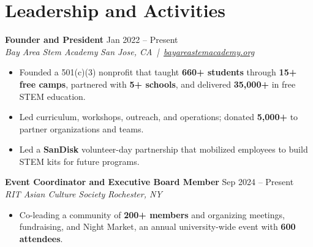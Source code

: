 \documentclass[10pt,letterpaper]{article}
\newif\ifresumeFirstRole
\newcommand{\resumeRole}[4]{%
  \ifresumeFirstRole
    \global\resumeFirstRolefalse
  \else
    \vspace{0pt plus 1fill}%
  \fi
  \textbf{#1} \hfill #2\\
  \textit{#3} \hfill \textit{#4}
}
\begin{document}
\section*{Leadership and Activities}
\resumeRole{Founder and President}{Jan 2022 -- Present}{Bay Area Stem Academy}{San Jose, CA \,|\, \href{https://bayareastemacademy.org}{bayareastemacademy.org}}
\begin{itemize}
  \item Founded a 501(c)(3) nonprofit that taught \textbf{660+ students} through \textbf{15+ free camps}, partnered with \textbf{5+ schools}, and delivered \textbf{\textdollar{}35,000+} in free STEM education.
  \item Led curriculum, workshops, outreach, and operations; donated \textbf{\textdollar{}5,000+} to partner organizations and teams.
  \item Led a \textbf{SanDisk} volunteer-day partnership that mobilized employees to build STEM kits for future programs.
\end{itemize}
\resumeRole{Event Coordinator and Executive Board Member}{Sep 2024 -- Present}{RIT Asian Culture Society}{Rochester, NY}
\begin{itemize}
  \item Co-leading a community of \textbf{200+ members} and organizing meetings, fundraising, and Night Market, an annual university-wide event with \textbf{600 attendees}.
\end{itemize}
\end{document}
